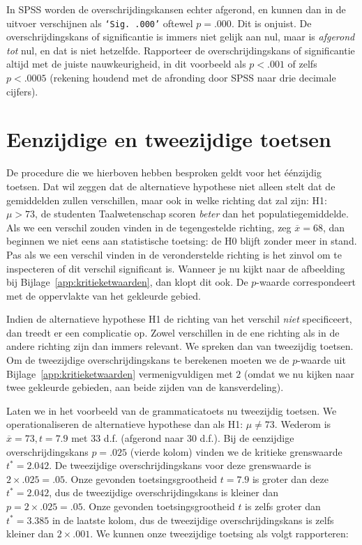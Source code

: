 \documentclass[
]{book}
\begin{document}
In SPSS worden de overschrijdingskansen echter afgerond, en kunnen dan
in de uitvoer verschijnen als \texttt{‘Sig.\ .000’} oftewel \(p=.000\). Dit is
onjuist. De overschrijdingskans of significantie is immers niet gelijk
aan nul, maar is \emph{afgerond tot} nul, en dat is niet hetzelfde.
Rapporteer de overschrijdingskans of significantie altijd met de juiste
nauwkeurigheid, in dit voorbeeld als \(p<.001\) of zelfs \(p<.0005\)
(rekening houdend met de afronding door SPSS naar drie decimale
cijfers).

\hypertarget{sec:ttoets-eenzijdigtweezijdig}{%
\section{Eenzijdige en tweezijdige toetsen}\label{sec:ttoets-eenzijdigtweezijdig}}

De procedure die we hierboven hebben besproken geldt voor het éénzijdig
toetsen. Dat wil zeggen dat de alternatieve hypothese niet alleen stelt
dat de gemiddelden zullen verschillen, maar ook in welke richting dat
zal zijn: H1: \(\mu >73\), de studenten Taalwetenschap scoren \emph{beter} dan
het populatiegemiddelde. Als we een verschil zouden vinden in de
tegengestelde richting, zeg \(\overline{x}=68\), dan beginnen we niet eens
aan statistische toetsing: de H0 blijft zonder meer in stand. Pas als we
een verschil vinden in de veronderstelde richting is het zinvol om te
inspecteren of dit verschil significant is. Wanneer je nu kijkt naar de
afbeelding bij
Bijlage~\ref{app:kritieketwaarden}, dan klopt dit ook. De \(p\)-waarde
correspondeert met de oppervlakte van het gekleurde gebied.

Indien de alternatieve hypothese H1 de richting van het verschil \emph{niet}
specificeert, dan treedt er een complicatie op. Zowel verschillen in de
ene richting als in de andere richting zijn dan immers relevant. We
spreken dan van tweezijdig toetsen. Om de tweezijdige
overschrijdingskans te berekenen moeten we de \(p\)-waarde uit
Bijlage~\ref{app:kritieketwaarden} vermenigvuldigen met \(2\) (omdat we nu
kijken naar twee gekleurde gebieden, aan beide zijden van de
kansverdeling).

Laten we in het voorbeeld van de grammaticatoets nu tweezijdig toetsen.
We operationaliseren de alternatieve hypothese dan als H1: \(\mu \ne 73\).
Wederom is \(\overline{x}=73, t=7.9\) met 33 d.f. (afgerond naar 30 d.f.).
Bij de eenzijdige overschrijdingskans \(p=.025\) (vierde kolom) vinden we
de kritieke grenswaarde \(t^*=2.042\). De tweezijdige overschrijdingskans
voor deze grenswaarde is \(2 \times .025 = .05\). Onze gevonden
toetsingsgrootheid \(t=7.9\) is groter dan deze \(t^*=2.042\), dus de
tweezijdige overschrijdingskans is kleiner dan \(p=2\times.025=.05\). Onze
gevonden toetsingsgrootheid \(t\) is zelfs groter dan \(t^*=3.385\) in de
laatste kolom, dus de tweezijdige overschrijdingskans is zelfs kleiner
dan \(2\times.001\). We kunnen onze tweezijdige toetsing als volgt
rapporteren:
\end{document}
